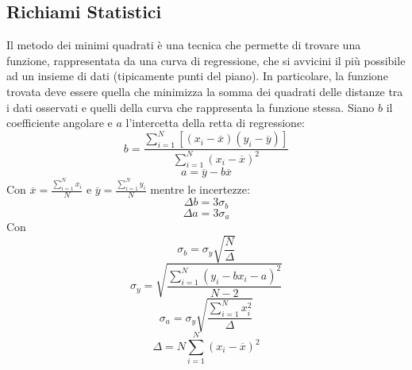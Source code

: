 \subsection{Richiami Statistici}
Il metodo dei minimi quadrati è una tecnica che permette di trovare una funzione, rappresentata da una curva di regressione, che si avvicini il più possibile ad un insieme di dati (tipicamente punti del piano). In particolare, la funzione trovata deve essere quella che minimizza la somma dei quadrati delle distanze tra i dati osservati e quelli della curva che rappresenta la funzione stessa. Siano $b$ il coefficiente angolare e $a$ l'intercetta della retta di regressione:
\begin{equation}
	b=\frac{\displaystyle\sum_{i=1}^{N}[(x_i-\overline{x})(y_i-\overline{y})]}{\displaystyle\sum_{i=1}^{N}(x_i-\overline{x})^2}
\end{equation}
\begin{equation}
	a=\overline{y}-b\overline{x}
\end{equation}
Con $\overline{x}=\frac{\displaystyle\sum_{i=1}^{N}x_i}{N}$ e $\overline{y}=\frac{\displaystyle\sum_{i=1}^{N}y_i}{N}$
mentre le incertezze:
\begin{equation}
	\Delta b=3\sigma_b
\end{equation}
\begin{equation}
	\Delta a=3\sigma_a
\end{equation}
Con $$\sigma_b=\sigma_y\sqrt{\frac{N}{\Delta}}$$
$$\sigma_y=\sqrt{\frac{\displaystyle\sum_{i=1}^{N}(y_i-bx_i-a)^2}{N-2}}$$
$$\sigma_a=\sigma_y\sqrt{\frac{\displaystyle\sum_{i=1}^{N}x_i^2}{\Delta}}$$
$$\Delta=N\displaystyle\sum_{i=1}^{N}(x_i-\overline{x})^2$$

